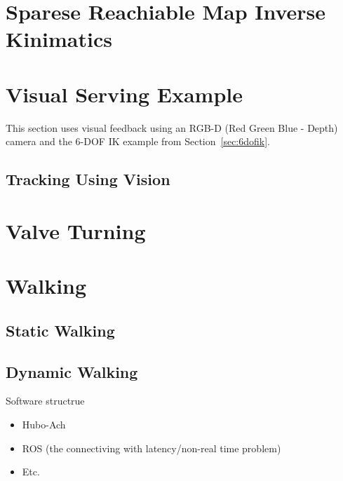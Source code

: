 \section{Sparese Reachiable Map Inverse Kinimatics}\label{sec:srm}
		
		


\section{Visual Serving Example}
This section uses visual feedback using an RGB-D (Red Green Blue - Depth) camera and the 6-DOF IK example from Section~\ref{sec:6dofik}.
	\subsection{Tracking Using Vision}
		
		

\section{Valve Turning}
	

\section{Walking}
	
	\subsection{Static Walking}\label{sec:staticWalking}
		
	\subsection{Dynamic Walking}\label{sec:dynamicWalking}
		










Software structrue
\begin{itemize}
\item Hubo-Ach
\item ROS (the connectiving with latency/non-real time problem)

\item Etc.
\end{itemize}







